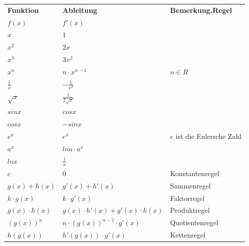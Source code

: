\documentclass[a4paper,12pt]{article}
\begin{document}
\bgroup
\def\arraystretch{1.5}%
\begin{tabular}{p{5cm}|p{5cm}|p{5cm}}
  {\bf Funktion} & {\bf Ableitung} & {\bf Bemerkung,Regel}\\
  $f(x)$ & $f'(x)$ & \\
  \hline
  $x$ & $1$ & \\
  $x^2$ & $2x$ & \\
  $x^3$ & $3x^2$ & \\
  $x^n$ & $n\cdot x^{n-1}$ & $n \in R$ \\
  $\frac{1}{x}$ & $-\frac{1}{x^2}$ & \\
  $\sqrt{x}$ & $\frac{1}{2\sqrt{x}}$ & \\
  $sin{x}$ & $cos{x}$ & \\
  $cos{x}$ & $-sin{x}$ & \\
  $e^x$ & $e^x$ & $e$ ist die Eulersche Zahl \\
  $a^x$ & $ln{a}\cdot a^x$ & \\
  $ln{x}$ & $\frac{1}{x}$ & \\
  \hline
  $c$ & $0$ & Konstantenregel \\
  $g(x)+h(x)$ & $g'(x)+h'(x)$ & Summenregel \\
  $k \cdot g(x)$ & $k \cdot g'(x)$ & Faktorregel \\
  $g(x)\cdot h(x)$ & $g(x) \cdot h'(x) + g'(x)\cdot h(x)$ & Produktregel \\
  $(g(x))^n$ & $n \cdot (g(x))^{n-1} \cdot g'(x)$ & Quotientenregel \\
  $h(g(x))$ & $h'(g(x)) \cdot g'(x)$ & Kettenregel \\
\end{tabular}
\egroup

\newpage
\end{document}
